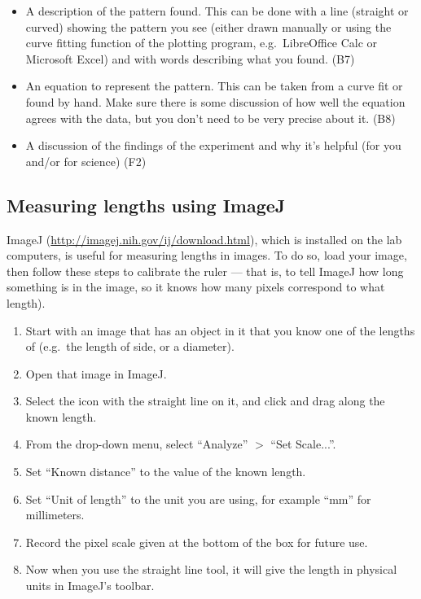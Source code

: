 \begin{enumerate}
\begin{itemize}
		\item A description of the pattern found. This can be done with a line (straight or curved) showing the pattern you see (either drawn manually or using the curve fitting function of the plotting program, e.g.\ LibreOffice Calc or Microsoft Excel) and with words describing what you found. (B7)
		
		\item An equation to represent the pattern. This can be taken from a curve fit or found by hand. Make sure there is some discussion of how well the equation agrees with the data, but you don't need to be very precise about it. (B8)
		
		\item A discussion of the findings of the experiment and why it's helpful (for you and/or for science) (F2)
	\end{itemize}

\end{enumerate}

\subsection{Measuring lengths using ImageJ}

ImageJ (\url{http://imagej.nih.gov/ij/download.html}), which is installed on the lab computers, is useful for measuring lengths in images. To do so, load your image, then follow these steps to calibrate the ruler --- that is, to tell ImageJ how long something is in the image, so it knows how many pixels correspond to what length).

\begin{enumerate}
	\item Start with an image that has an object in it that you know one of the lengths of (e.g.\ the length of side, or a diameter).
	
	\item Open that image in ImageJ.
	
	\item Select the icon with the straight line on it, and click and drag along the known length.
	
	\item From the drop-down menu, select ``Analyze'' $>$ ``Set Scale...''.
	
	\item Set ``Known distance'' to the value of the known length.
	
	\item Set ``Unit of length'' to the unit you are using, for example ``mm'' for millimeters.
	
	\item Record the pixel scale given at the bottom of the box for future use.
	
	\item Now when you use the straight line tool, it will give the length in physical units in ImageJ's toolbar.
\end{enumerate}

